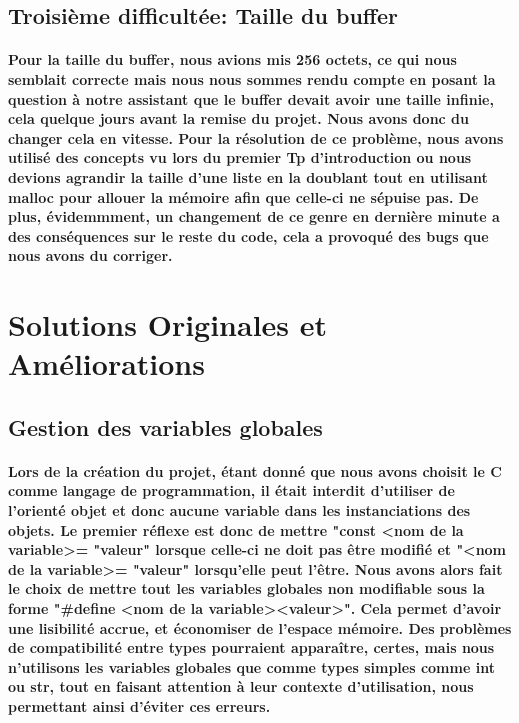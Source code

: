 \documentclass[utf8]{article}
\begin{document}
\subsection{Troisième difficultée: Taille du buffer}
\paragraph{Pour la taille du buffer, nous avions mis 256 octets, ce qui nous semblait correcte mais 
nous nous sommes rendu compte en posant la question à notre assistant que le buffer devait avoir une taille infinie,
cela quelque jours avant la remise du projet. Nous avons donc du changer cela en vitesse. Pour la résolution de ce problème,
nous avons utilisé des concepts vu lors du premier Tp d'introduction ou nous devions agrandir la taille d'une 
liste en la doublant tout en utilisant malloc pour allouer la mémoire afin que celle-ci ne sépuise pas.
De plus, évidemmment, un changement de ce genre en dernière minute a des conséquences sur le reste du code, cela a provoqué 
des bugs que nous avons du corriger.}


\section{Solutions Originales et Améliorations}
\subsection{Gestion des variables globales}
\paragraph{Lors de la création du projet, étant donné que nous avons choisit le C comme langage de programmation, il était interdit 
d'utiliser de l'orienté objet et donc aucune variable dans les instanciations des objets. Le premier réflexe est donc de mettre
"const \textless nom de la variable\textgreater  = "valeur" lorsque celle-ci ne doit pas être modifié et "\textless nom de la variable\textgreater = "valeur" lorsqu'elle 
peut l'être. Nous avons alors fait le choix de mettre tout les variables globales non modifiable sous la forme 
"\#define \textless nom de la variable\textgreater \textless valeur\textgreater". Cela permet d'avoir une lisibilité accrue, et économiser de l'espace mémoire. Des
problèmes de compatibilité entre types pourraient apparaître, certes, mais nous n'utilisons les variables globales que comme types simples comme int ou str, tout en
faisant attention à leur contexte d'utilisation, nous permettant ainsi d'éviter ces erreurs.}
\end{document}
